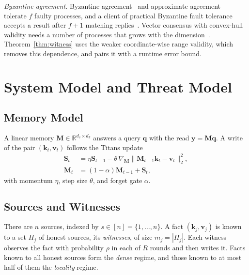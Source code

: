 \documentclass[journal]{IEEEtran}
\theoremstyle{remark}
\begin{document}
\emph{Byzantine agreement.} Byzantine agreement~\cite{lamport1982byzantine} and approximate agreement~\cite{dolev1986approximate} tolerate $f$ faulty processes, and a client of practical Byzantine fault tolerance accepts a result after $f+1$ matching replies~\cite{castro1999pbft}. Vector consensus with convex-hull validity needs a number of processes that grows with the dimension~\cite{vaidya2013vector,mendes2013multidimensional}. Theorem~\ref{thm:witness} uses the weaker coordinate-wise range validity, which removes this dependence, and pairs it with a runtime error bound.

\section{System Model and Threat Model}\label{sec:model}
\subsection{Memory Model}
A linear memory $\bm{M}\in\mathbb{R}^{d_v\times d_k}$ answers a query $\bm{q}$ with the read $\bm{y}=\bm{M}\bm{q}$. A write of the pair $(\bm{k}_t,\bm{v}_t)$ follows the Titans update~\cite{behrouz2024titans}
\begin{equation}\label{eq:titans}
\begin{aligned}
\bm{S}_t&=\eta\bm{S}_{t-1}-\theta\,\nabla_{\bm{M}}\|\bm{M}_{t-1}\bm{k}_t-\bm{v}_t\|_2^2,\\
\bm{M}_t&=(1-\alpha)\bm{M}_{t-1}+\bm{S}_t,
\end{aligned}
\end{equation}
with momentum $\eta$, step size $\theta$, and forget gate $\alpha$.

\subsection{Sources and Witnesses}
There are $n$ sources, indexed by $s\in[n]=\{1,\dots,n\}$. A fact $(\bm{k}_j,\bm{v}_j)$ is known to a set $H_j$ of honest sources, its \emph{witnesses}, of size $m_j=|H_j|$. Each witness observes the fact with probability $\rho$ in each of $R$ rounds and then writes it. Facts known to all honest sources form the \emph{dense} regime, and those known to at most half of them the \emph{locality} regime.
\end{document}
